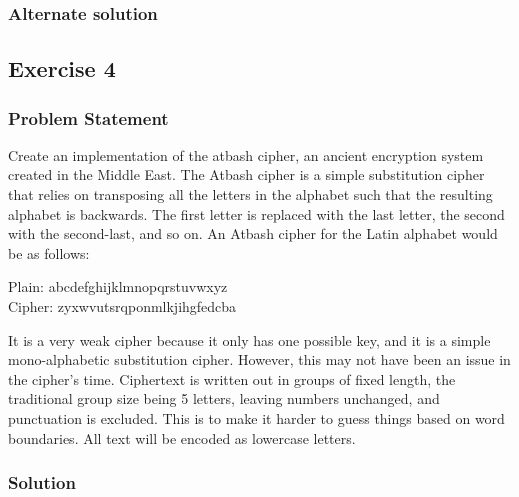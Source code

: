 \documentclass{report}
\begin{document}
    \pagebreak 
    \subsubsection{Alternate solution}
    \bigbreak \noindent 

    \pagebreak 
    \subsection{Exercise 4}
    \bigbreak \noindent 
    \subsubsection{Problem Statement}
    \bigbreak \noindent 
    Create an implementation of the atbash cipher, an ancient encryption system created in the Middle East.
    \bigbreak \noindent 
    The Atbash cipher is a simple substitution cipher that relies on transposing all the letters in the alphabet such that the resulting alphabet is backwards. The first letter is replaced with the last letter, the second with the second-last, and so on.
    \bigbreak \noindent 
    An Atbash cipher for the Latin alphabet would be as follows:
    \bigbreak \noindent 
    \begin{center}
        Plain:  abcdefghijklmnopqrstuvwxyz \\
        Cipher: zyxwvutsrqponmlkjihgfedcba
    \end{center}
    \bigbreak \noindent 
    It is a very weak cipher because it only has one possible key, and it is a simple mono-alphabetic substitution cipher. However, this may not have been an issue in the cipher's time.
    \bigbreak \noindent 
    Ciphertext is written out in groups of fixed length, the traditional group size being 5 letters, leaving numbers unchanged, and punctuation is excluded. This is to make it harder to guess things based on word boundaries. All text will be encoded as lowercase letters.

    \bigbreak \noindent 
    \subsubsection{Solution}
    \bigbreak \noindent 
\end{document}
